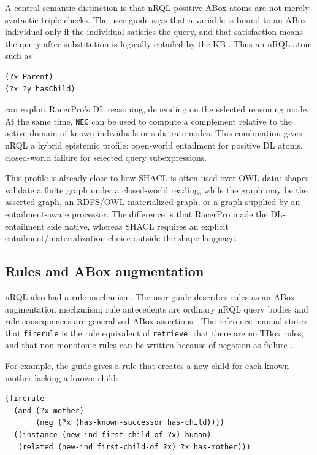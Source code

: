 \documentclass[11pt,letterpaper]{article}
\newcommand{\nrql}{nRQL}
\newcommand{\racer}{RacerPro}
\newcommand{\shacl}{SHACL}
\newcommand{\naf}{negation as failure}
\newcommand{\abox}{ABox}
\newcommand{\tbox}{TBox}
\newcommand{\owl}{OWL}
\begin{document}
A central semantic distinction is that \nrql{} positive \abox{} atoms are not merely syntactic triple checks. The user guide says that a variable is bound to an \abox{} individual only if the individual satisfies the query, and that satisfaction means the query after substitution is logically entailed by the KB \cite[p.~82]{racerug}. Thus an \nrql{} atom such as

\begin{lstlisting}[language=nrql]
(?x Parent)
(?x ?y hasChild)
\end{lstlisting}

can exploit \racer{}'s DL reasoning, depending on the selected reasoning mode. At the same time, \texttt{NEG} can be used to compute a complement relative to the active domain of known individuals or substrate nodes. This combination gives \nrql{} a hybrid epistemic profile: open-world entailment for positive DL atoms, closed-world failure for selected query subexpressions.

This profile is already close to how \shacl{} is often used over \owl{} data: shapes validate a finite graph under a closed-world reading, while the graph may be the asserted graph, an RDFS/OWL-materialized graph, or a graph supplied by an entailment-aware processor. The difference is that \racer{} made the DL-entailment side native, whereas \shacl{} requires an explicit entailment/materialization choice outside the shape language.

\subsection{Rules and ABox augmentation}

\nrql{} also had a rule mechanism. The user guide describes rules as an \abox{} augmentation mechanism; rule antecedents are ordinary \nrql{} query bodies and rule consequences are generalized \abox{} assertions \cite[pp.~125--127]{racerug}. The reference manual states that \texttt{firerule} is the rule equivalent of \texttt{retrieve}, that there are no \tbox{} rules, and that non-monotonic rules can be written because of \naf{} \cite[pp.~160--161]{racerrm}.

For example, the guide gives a rule that creates a new child for each known mother lacking a known child:

\begin{lstlisting}[language=nrql,caption={ABox augmentation with a missing-successor antecedent.}]
(firerule
  (and (?x mother)
       (neg (?x (has-known-successor has-child))))
  ((instance (new-ind first-child-of ?x) human)
   (related (new-ind first-child-of ?x) ?x has-mother)))
\end{lstlisting}
\end{document}
